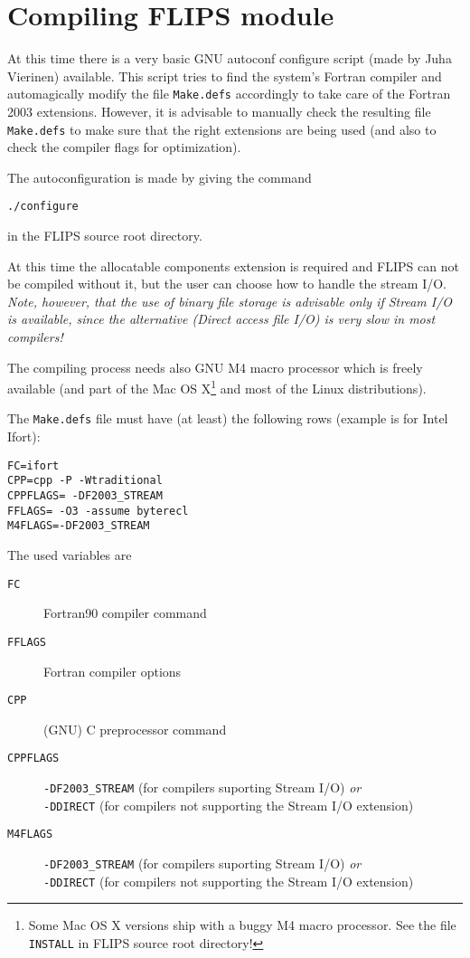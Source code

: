 \documentclass[a4paper,twoside]{refrep}
\newcommand{\code}[1]{{\tt #1}}
\newcommand{\aitem}[1]{\item[{\tt #1}]}
\newenvironment{arglist}
	{\begin{description}}
	{\end{description}}
\begin{document}
 
\section{Compiling FLIPS module}\label{f2003ext}

At this time there is a very basic GNU autoconf configure script (made by Juha Vierinen) available. This script tries to find the system's Fortran compiler and automagically modify the file \verb!Make.defs! accordingly to take care of the Fortran 2003 extensions. However, it is advisable to manually check the resulting file \verb!Make.defs! to make sure that the right extensions are being used (and also to check the compiler flags for optimization). 

The autoconfiguration is made by giving the command
\begin{verbatim}
./configure
\end{verbatim}
in the FLIPS source root directory.

At this time the allocatable components extension is required and FLIPS can not be compiled without it, but the user can choose how to handle the stream I/O. \attention \emph{Note, however, that the use of binary file storage is advisable only if Stream I/O is available, since the alternative (Direct access file I/O) is very slow in most compilers!}

\attention The compiling process needs also GNU M4 macro processor which is freely available (and part of the Mac OS X\footnote{Some Mac OS X versions ship with a buggy M4 macro processor. See the file \code{INSTALL} in FLIPS source root directory!} and most of the Linux distributions).

The \verb!Make.defs! file must have (at least) the following rows (example is for Intel Ifort):

\begin{verbatim}
FC=ifort
CPP=cpp -P -Wtraditional 
CPPFLAGS= -DF2003_STREAM
FFLAGS= -O3 -assume byterecl 
M4FLAGS=-DF2003_STREAM
\end{verbatim}

The used variables are
\begin{arglist}
\aitem{FC} Fortran90 compiler command
\aitem{FFLAGS} Fortran compiler options
\aitem{CPP} (GNU) C preprocessor command
\aitem{CPPFLAGS} \verb!-DF2003_STREAM! (for compilers suporting Stream I/O) \emph{or}\\ \verb!-DDIRECT! (for compilers not supporting the Stream I/O extension)
\aitem{M4FLAGS} \verb!-DF2003_STREAM! (for compilers suporting Stream I/O) \emph{or}\\ \verb!-DDIRECT! (for compilers not supporting the Stream I/O extension)
\end{arglist}
\end{document}
